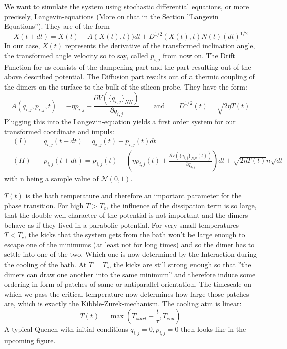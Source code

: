 	We want to simulate the system using stochastic differential equations, or more precisely, Langevin-equations (More on that in the Section ''Langevin Equations''). They are of the form
	\begin{equation}
		X(t + dt) =	X(t) + A(X(t), t))dt + D^{1/2}(X(t), t) N(t) (dt)^{1/2}
	\end{equation}
	In our case, $X(t)$ represents the derivative of the transformed inclination angle, the transformed angle velocity so to say, called $p_{i, j}$ from now on. The Drift Function for us consists of the dampening part and the part resulting out of the above described potential. The Diffusion part results out of a thermic coupling of the dimers on the surface to the bulk of the silicon probe. They have the form:
	\begin{equation}
		A(q_{i, j}, p_{i, j}, t) = - \eta p_{i, j} - \frac{\partial V(\lbrace q_{i, j}\rbrace_{NN})}{\partial q_{i, j}} \qquad \text{and} \qquad D^{1/2}(t) =	\sqrt{2\eta T(t)}
	\end{equation}
	Plugging this into the Langevin-equation yields a first order system for our transformed coordinate and impuls:
	\begin{align}
		&(I)  ~~~&&q_{i, j}(t + dt) = q_{i, j}(t) +	p_{i, j}(t) dt  \\
		&(II) &&p_{i, j}(t + dt) = p_{i, j}(t)- \left(\eta p_{i, j}(t) + \frac{\partial V(\lbrace q_{i, j}\rbrace_{NN}(t))}{\partial q_{i, j}}  \right) dt		+ \sqrt{2 \eta T(t)} n \sqrt{dt}
	\end{align}
	with n being a sample value of $\mathcal{N}(0, 1)$.
	
	$T(t)$ is the bath temperature and therefore an important parameter for the phase transition. For high $T > T_c$, the influence of the dissipation term is so large, that the double well character of the potential is not important and the dimers behave as if they lived in a parabolic potential. For very small temperatures $T < T_c$, the kicks that the system gets from the bath won't be large enough to escape one of the minimums (at least not for long times) and so the dimer has to settle into one of the two. Which one is now determined by the Interaction during the cooling of the bath. At $T =	T_c$, the kicks are still strong enough so that ''the dimers can draw one another into the same minimum'' and therefore induce some ordering in form of patches of same or antiparallel orientation. The timescale on which we pass the critical temperature now determines how large those patches are, which is exactly the Kibble-Zurek-mechanism. The cooling atm is linear:
	\begin{equation}
		T(t) =	\max\left(T_{start} - \frac{t}{\tau}, T_{end}\right)
	\end{equation}
	A typical Quench with initial conditions $q_{i,j} =	0, p_{i, j} =0$ then looks like in the upcoming figure.
	
